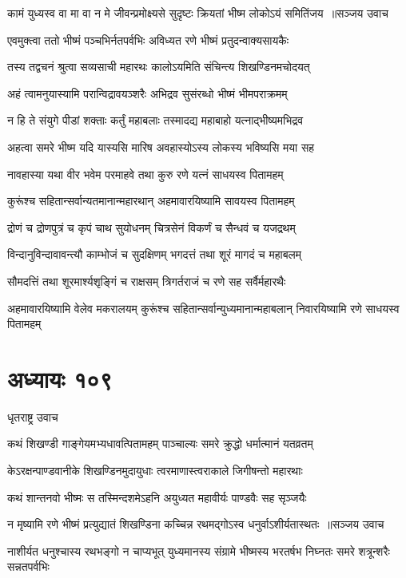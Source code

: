 \threelineshloka
{कामं युध्यस्व वा मा वा न मे जीवन्प्रमोक्ष्यसे}
{सुदृष्टः क्रियतां भीष्म लोकोऽयं समितिंजय ॥सञ्जय उवाच}
{}


\twolineshloka
{एवमुक्त्वा ततो भीष्मं पञ्चभिर्नतपर्वभिः}
{अविध्यत रणे भीष्मं प्रतुदन्वाक्यसायकैः}


\twolineshloka
{तस्य तद्वचनं श्रुत्वा सव्यसाची महारथः}
{कालोऽयमिति संचिन्त्य शिखण्डिनमचोदयत्}


\twolineshloka
{अहं त्वामनुयास्यामि परान्विद्रावयञ्शरैः}
{अभिद्रव सुसंरब्धो भीष्मं भीमपराक्रमम्}


\twolineshloka
{न हि ते संयुगे पीडां शक्ताः कर्तुं महाबलाः}
{तस्मादद्य महाबाहो यत्नाद्भीष्यमभिद्रव}


\twolineshloka
{अहत्वा समरे भीष्म यदि यास्यसि मारिष}
{अवहास्योऽस्य लोकस्य भविष्यसि मया सह}


\twolineshloka
{नावहास्या यथा वीर भवेम परमाहवे}
{तथा कुरु रणे यत्नं साधयस्व पितामहम्}


\twolineshloka
{कुरूंश्च सहितान्सर्वान्यतमानान्महारथान्}
{अहमावारयिष्यामि सावयस्व पितामहम्}


\twolineshloka
{द्रोणं च द्रोणपुत्रं च कृपं चाथ सुयोधनम्}
{चित्रसेनं विकर्णं च सैन्धवं च यजद्रथम्}


\twolineshloka
{विन्दानुविन्दावावन्त्यौ काम्भोजं च सुदक्षिणम्}
{भगदत्तं तथा शूरं मागदं च महाबलम्}


\twolineshloka
{सौमदत्तिं तथा शूरमार्श्यशृङ्गिं च राक्षसम्}
{त्रिगर्तराजं च रणे सह सर्वैर्महारथैः}


\threelineshloka
{अहमावारयिष्यामि वेलेव मकरालयम्}
{कुरूंश्च सहितान्सर्वान्युध्यमानान्महाबलान्}
{निवारयिष्यामि रणे साधयस्व पितामहम्}


\chapter{अध्यायः १०९}
\twolineshloka
{धृतराष्ट्र उवाच}
{}


\twolineshloka
{कथं शिखण्डी गाङ्गेयमभ्यधावत्पितामहम्}
{पाञ्चाल्यः समरे क्रुद्धो धर्मात्मानं यतव्रतम्}


\twolineshloka
{केऽरक्षन्पाण्डवानीके शिखण्डिनमुदायुधाः}
{त्वरमाणास्त्वराकाले जिगीषन्तो महारथाः}


\twolineshloka
{कथं शान्तनवो भीष्मः स तस्मिन्दशमेऽहनि}
{अयुध्यत महावीर्यः पाण्डवैः सह सृञ्जयैः}


\threelineshloka
{न मृष्यामि रणे भीष्मं प्रत्युद्यातं शिखण्डिना}
{कच्चिन्न रथमद्गोऽस्व धनुर्वाऽशीर्यतास्थतः ॥सञ्जय उवाच}
{}


\threelineshloka
{नाशीर्यत धनुश्चास्य रथभङ्गो न चाप्यभूत्}
{युध्यमानस्य संग्रामे भीष्मस्य भरतर्षभ}
{निघ्नतः समरे शत्रून्शरैः सन्नतपर्वभिः}


